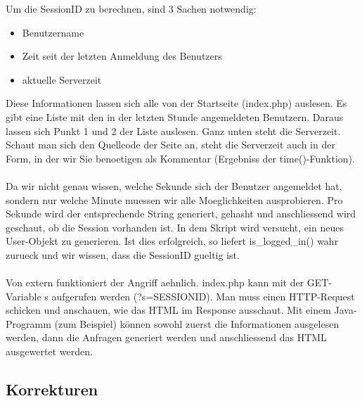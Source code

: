 Um die SessionID zu berechnen, sind 3 Sachen notwendig:
 \begin{itemize}
    \item Benutzername
    \item Zeit seit der letzten Anmeldung des Benutzers
    \item aktuelle Serverzeit
\end{itemize}
Diese Informationen lassen sich alle von der Startseite (index.php) auslesen. Es gibt eine Liste mit den in der letzten Stunde angemeldeten Benutzern. Daraus lassen sich Punkt 1 und 2 der Liste auslesen. Ganz unten steht die Serverzeit. Schaut man sich den Quellcode der Seite an, steht die Serverzeit auch in der Form, in der wir Sie benoetigen als Kommentar (Ergebniss der time()-Funktion).\\\\
Da wir nicht genau wissen, welche Sekunde sich der Benutzer angemeldet hat, sondern nur welche Minute muessen wir alle Moeglichkeiten ausprobieren. Pro Sekunde wird der entsprechende String generiert, gehasht und anschliessend wird geschaut, ob die Session vorhanden ist. In dem Skript wird versucht, ein neues User-Objekt zu generieren. Ist dies erfolgreich, so liefert is\_logged\_in() wahr zurueck und wir wissen, dass die SessionID gueltig ist.\\\\
Von extern funktioniert der Angriff aehnlich. index.php kann mit der GET-Variable s aufgerufen werden (?s=SESSIONID). Man muss einen HTTP-Request schicken und anschauen, wie das HTML im Response ausschaut. Mit einem Java-Programm (zum Beispiel) können sowohl zuerst die Informationen ausgelesen werden, dann die Anfragen generiert werden und anschliessend das HTML ausgewertet werden.

\subsection{Korrekturen}


